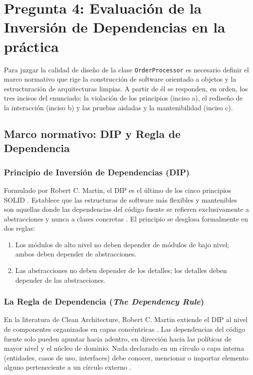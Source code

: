 \section{Pregunta 4: Evaluación de la Inversión de Dependencias en la práctica}


Para juzgar la calidad de diseño de la clase \texttt{OrderProcessor} es necesario definir el marco normativo que rige la construcción de software orientado a objetos y la estructuración de arquitecturas limpias. A partir de él se responden, en orden, los tres incisos del enunciado: la violación de los principios (inciso a), el rediseño de la interacción (inciso b) y las pruebas aisladas y la mantenibilidad (inciso c).

\subsection{Marco normativo: DIP y Regla de Dependencia}

\subsubsection*{Principio de Inversión de Dependencias (DIP)}

Formulado por Robert C. Martin, el DIP es el último de los cinco principios SOLID \parencite{martin2017}. Establece que las estructuras de software más flexibles y mantenibles son aquellas donde las dependencias del código fuente se refieren exclusivamente a abstracciones y nunca a clases concretas \parencite{martin2017}. El principio se desglosa formalmente en dos reglas:

\begin{enumerate}
    \item Los módulos de alto nivel no deben depender de módulos de bajo nivel; ambos deben depender de abstracciones.
    \item Las abstracciones no deben depender de los detalles; los detalles deben depender de las abstracciones.
\end{enumerate}

\subsubsection*{La Regla de Dependencia (\emph{The Dependency Rule})}

En la literatura de Clean Architecture, Robert C. Martin extiende el DIP al nivel de componentes organizados en capas concéntricas \parencite{martin2017}. Las dependencias del código fuente solo pueden apuntar hacia adentro, en dirección hacia las políticas de mayor nivel y el núcleo de dominio. Nada declarado en un círculo o capa interna (entidades, casos de uso, interfaces) debe conocer, mencionar o importar elemento alguno perteneciente a un círculo externo \parencite{martin2017}.


